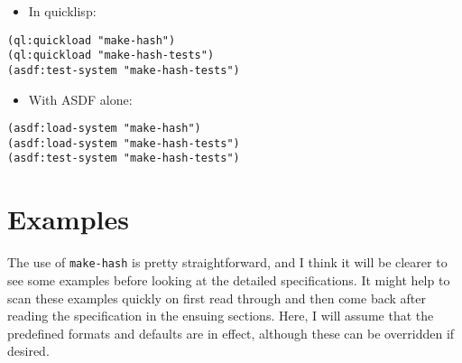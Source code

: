 \documentclass[11pt]{article}
\begin{document}
\begin{itemize}
\item In quicklisp:
\end{itemize}

\begin{verbatim}
(ql:quickload "make-hash")
(ql:quickload "make-hash-tests")
(asdf:test-system "make-hash-tests")
\end{verbatim}


     
    
\begin{itemize}
\item With ASDF alone:
\end{itemize}

\begin{verbatim}
(asdf:load-system "make-hash")
(asdf:load-system "make-hash-tests")
(asdf:test-system "make-hash-tests")
\end{verbatim}


     
\section{Examples}
\label{sec-3}


  The use of \texttt{make-hash} is pretty straightforward, and I think it will be
  clearer to see some examples before looking at the detailed specifications.
  It might help to scan these examples quickly on first read through and
  then come back after reading the specification in the ensuing sections.
  Here, I will assume that the predefined formats and defaults are in
  effect, although these can be overridden if desired.
\end{document}
